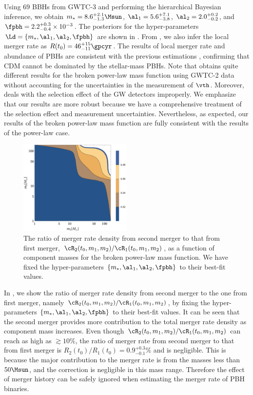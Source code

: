 \documentclass[
reprint,           %
superscriptaddress,%
amsmath,           %
amssymb,           %
aps,               %
prd,               %
notitlepage,       %
longbibliography,  %
floatfix,          %
nofootinbib,
]{revtex4-1}
\begin{document}
Using $69$ BBHs from GWTC-3 and performing the hierarchical Bayesian inference, we obtain $m_* = 8.6^{+2.1}_{-1.3} \Msun$, $\al_1 = 5.6^{+7.1}_{-3.8}$, $\al_2 = 2.0^{+0.2}_{-0.2}$, and $\fpbh = 2.2^{+0.3}_{-0.4} \times 10^{-3}$. The posteriors for the hyper-parameters $\Ld = \{m_*, \al_1, \al_2, \fpbh\}$ are shown in . From , we also infer the local merger rate as $R(t_0) = 46^{+15}_{-11} \gpcyr$. The results of local merger rate and abundance of PBHs are consistent with the previous estimations \cite{Chen:2018czv,Chen:2018rzo,Chen:2019irf,Wu:2020drm,Chen:2021nxo,Chen:2022fda}, confirming that CDM cannot be dominated by the stellar-mass PBHs. Note that \cite{Deng:2021ezy} obtains quite different results for the broken power-law mass function using GWTC-2 data without accounting for the uncertainties in the measurement of $\vth$. Moreover, \cite{Deng:2021ezy} deals with the selection effect of the GW detectors improperly. We emphasize that our results are more robust because we have a comprehensive treatment of the selection effect and measurement uncertainties. Nevertheless, as expected, our results of the broken power-law mass function are fully consistent with the results of the power-law case.

\begin{figure}[tbp!]
	\centering
	\includegraphics[width=0.5\textwidth]{ratio-bpower.pdf}
	\caption{\label{ratio-bpower}The ratio of merger rate density from second merger to that from first merger, $\cR_2(t_0, m_1, m_2)/\cR_1(t_0, m_1, m_2)$, as a function of component masses for the broken power-law mass function. We have fixed the hyper-parameters $\{m_*, \al_1, \al_2, \fpbh\}$ to their best-fit values.}
\end{figure}

In , we show the ratio of merger rate density from second merger to the one from first merger, namely $\cR_2(t_0, m_1, m_2)/\cR_1(t_0, m_1, m_2)$, by fixing the hyper-parameters $\{m_*, \al_1, \al_2, \fpbh\}$ to their best-fit values. It can be seen that the second merger provides more contribution to the total merger rate density as component mass increases. Even though $\cR_2(t_0, m_1, m_2)/\cR_1(t_0, m_1, m_2)$ can reach as high as $\gtrsim 10\%$, the ratio of merger rate from second merger to that from first merger is $R_2(t_0)/R_1(t_0) = 0.9^{+0.3}_{-0.1}\%$ and is negligible. This is because the major contribution to the merger rate is from the masses less than $50\Msun$, and the correction is negligible in this mass range. Therefore the effect of merger history can be safely ignored when estimating the merger rate of PBH binaries.
\end{document}
